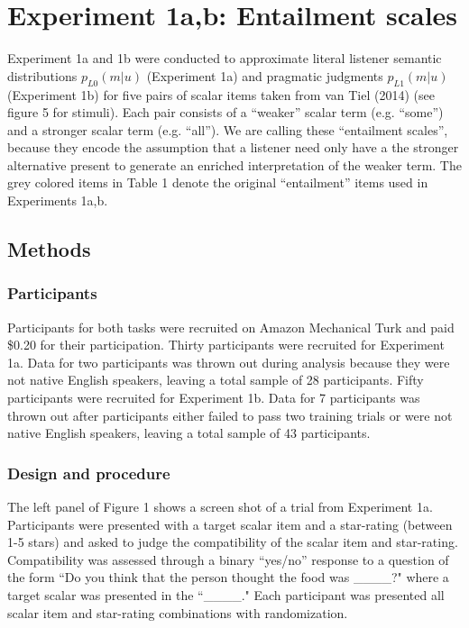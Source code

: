 \documentclass[10pt, letterpaper]{article}
\begin{document}
\section{Experiment 1a,b: Entailment
scales}\label{experiment-1ab-entailment-scales}

Experiment 1a and 1b were conducted to approximate literal listener
semantic distributions \(p_{L0}(m|u)\) (Experiment 1a) and pragmatic
judgments \(p_{L1}(m|u)\) (Experiment 1b) for five pairs of scalar items
taken from van Tiel (2014) (see figure 5 for stimuli). Each pair
consists of a ``weaker'' scalar term (e.g. ``some'') and a stronger
scalar term (e.g. ``all''). We are calling these ``entailment scales'',
because they encode the assumption that a listener need only have a the
stronger alternative present to generate an enriched interpretation of
the weaker term. The grey colored items in Table 1 denote the original
``entailment'' items used in Experiments 1a,b.

\subsection{Methods}\label{methods}

\subsubsection{Participants}\label{participants}

Participants for both tasks were recruited on Amazon Mechanical Turk and
paid \$0.20 for their participation. Thirty participants were recruited
for Experiment 1a. Data for two participants was thrown out during
analysis because they were not native English speakers, leaving a total
sample of 28 participants. Fifty participants were recruited for
Experiment 1b. Data for 7 participants was thrown out after participants
either failed to pass two training trials or were not native English
speakers, leaving a total sample of 43 participants.

\subsubsection{Design and procedure}\label{design-and-procedure}

The left panel of Figure 1 shows a screen shot of a trial from
Experiment 1a. Participants were presented with a target scalar item and
a star-rating (between 1-5 stars) and asked to judge the compatibility
of the scalar item and star-rating. Compatibility was assessed through a
binary ``yes/no'' response to a question of the form ``Do you think that
the person thought the food was \_\_\_\_?" where a target scalar was
presented in the ``\_\_\_\_." Each participant was presented all scalar
item and star-rating combinations with randomization.
\end{document}
